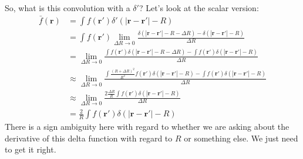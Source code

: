 \documentclass[letterpaper,twocolumn,amsmath,amssymb,jcp,10pt,aip]{revtex4-1}
\begin{document}
So, what is this convolution with a $\delta'$? Let's look at the
scalar version:
\begin{align}
  \bar{f}(\mathbf{r})
  &= \int f(\mathbf{r'}) \delta'(|\mathbf{r}-\mathbf{r'}| - R)
  \\
  &= \int
        f(\mathbf{r'})
        \lim_{\Delta R \rightarrow 0}
          \frac{\delta(|\mathbf{r}-\mathbf{r'}| - R - \Delta R)
            -
            \delta(|\mathbf{r}-\mathbf{r'}| - R)
      }{\Delta R}
  \\
  &= \lim_{\Delta R \rightarrow 0}
          \frac{\int
            f(\mathbf{r'})
            \delta(|\mathbf{r}-\mathbf{r'}| - R - \Delta R)
            -
            \int
            f(\mathbf{r'})
            \delta(|\mathbf{r}-\mathbf{r'}| - R)
      }{\Delta R}
  \\
  &\approx\lim_{\Delta R \rightarrow 0}
          \frac{\int
            \frac{(R+\Delta R)^2}{R^2}f(\mathbf{r'})
            \delta(|\mathbf{r}-\mathbf{r'}| - R)
            -
            \int
            f(\mathbf{r'})
            \delta(|\mathbf{r}-\mathbf{r'}| - R)
      }{\Delta R}
  \\
  &\approx\lim_{\Delta R \rightarrow 0}
          \frac{2\frac{\Delta R}{R} \int
            f(\mathbf{r'})
            \delta(|\mathbf{r}-\mathbf{r'}| - R)
      }{\Delta R}
  \\
  &= \frac{2}{R} \int
            f(\mathbf{r'})
            \delta(|\mathbf{r}-\mathbf{r'}| - R)
\end{align}
There is a sign ambiguity here with regard to whether we are asking
about the derivative of this delta function with regard to $R$ or
something else.  We just need to get it right.
\end{document}
